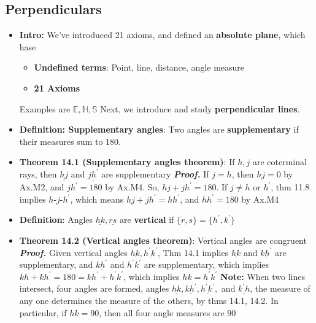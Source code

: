 \documentclass{report}
\begin{document}
    \pagebreak 
    \subsection{Perpendiculars}
    \begin{itemize}
        \item \textbf{Intro:} We've introduced 21 axioms, and defined an \textbf{absolute plane}, which hase
            \begin{itemize}
                \item \textbf{Undefined terms}: Point, line, distance, angle measure
                \item \textbf{21 Axioms}
            \end{itemize}
            Examples are $\mathbb{E}, \mathbb{H},\mathbb{S} $
            \bigbreak \noindent 
            Next, we introduce and study \textbf{perpendicular lines}.
        \item \textbf{Definition: Supplementary angles}: Two angles are \textbf{supplementary} if their measures sum to 180.
        \item \textbf{Theorem 14.1 (Supplementary angles theorem)}: If $h,j$ are coterminal rays, then $\underline{hj}$ and $\underline{jh^{\prime}} $ are supplementary
            \bigbreak \noindent 
            \textbf{\textit{Proof.}} If $j = h$, then $hj = 0$ by Ax.M2, and $jh^{\prime} = 180$ by Ax.M4. So, $hj + jh^{\prime} = 180$.
            \bigbreak \noindent 
            If $j \ne h$ or $h^{\prime}$, thm 11.8 implies $ h\text{-}j\text{-}h^{\prime}$, which means $hj + jh^{\prime} = hh^{\prime}$, and $hh^{\prime} =180$ by Ax.M4
        \item \textbf{Definition}: Angles $\underline{hk}, \underline{rs}$ are \textbf{vertical} if $\{r,s\}  = \{h^{\prime}, k^{\prime}\}$
        \item \textbf{Theorem 14.2 (Vertical angles theorem)}: Vertical angles are congruent
            \bigbreak \noindent 
            \textbf{\textit{Proof.}} Given vertical angles $\underline{hk}, \underline{h^{\prime}k^{\prime}}$, Thm 14.1 implies $\underline{hk}$ and $\underline{kh^{\prime} }$ are supplementary, and $ \underline{kh^{\prime}}$ and $h^{\prime}k^{\prime} $ are supplementary, which implies $kh + kh^{\prime} = 180 = kh^{\prime} + h^{\prime}k^{\prime}$, which implies $hk = h^{\prime}k^{\prime} $
            \bigbreak \noindent 
            \textbf{Note:} When two lines intersect, four angles are formed, angles $\underline{hk}, \underline{kh^{\prime}}, \underline{h^{\prime}k^{\prime}},$ and $\underline{k^{\prime}h} $, the measure of any one determines the measure of the others, by thms 14.1, 14.2. In particular, if $hk = 90$, then all four angle measures are $90$

\end{itemize}
\end{document}
